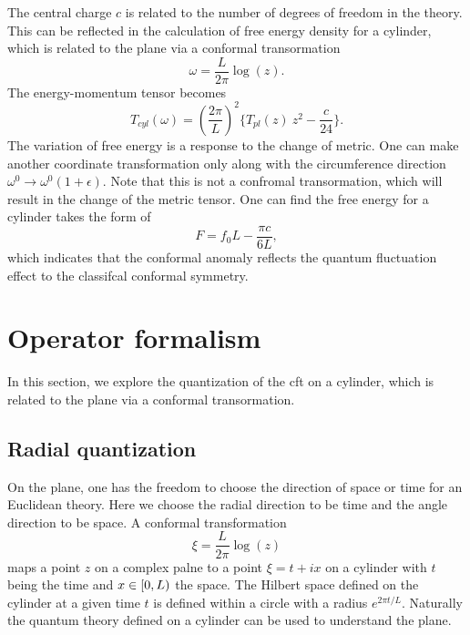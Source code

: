 \documentclass[submission, PhysLectNotes]{SciPost}
\begin{document}
The central charge $c$ is related to the number of degrees of freedom in the theory. This can be reflected in the calculation of free energy density for a cylinder, which is related to the plane via a conformal transormation
\begin{equation}
\omega = \frac{L}{2\pi} \log (z).
\end{equation}
The energy-momentum tensor becomes
\begin{equation}
T_{cyl}(\omega) = {\left(\frac{2\pi}{L}\right)}^2 \{T_{pl}(z)\ z^2 - \frac{c}{24}\}.
\end{equation}
The variation of free energy is a response to the change of metric. One can make another coordinate transformation only along with the circumference direction $\omega^0 \rightarrow \omega^0(1+\epsilon)$. Note that this is not a confromal transormation, which will result in the change of the metric tensor. One can find the free energy for a cylinder takes the form of
\begin{equation}
F = f_0 L - \frac{\pi c}{6L},
\end{equation}
which indicates that the conformal anomaly reflects the quantum fluctuation effect to the classifcal conformal symmetry.

\section{Operator formalism}
In this section, we explore the quantization of the cft on a cylinder, which is related to the plane via a conformal transormation.

\subsection{Radial quantization}
On the plane, one has the freedom to choose the direction of space or time for an Euclidean theory. Here we choose the radial direction to be time and the angle direction to be space. A conformal transformation
\begin{equation}
	\xi = \frac{L}{2\pi}\log\left(z\right)
\end{equation}
maps a point $z$ on a complex palne to a point $\xi=t+ix$ on a cylinder with $t$ being the time and $x\in \rinterval[soft open fences]{0}{L}$ the space. The Hilbert space defined on the cylinder at a given time $t$ is defined within a circle with a radius $e^{2\pi t/L}$. Naturally the quantum theory defined on a cylinder can be used to understand the plane.
\end{document}
